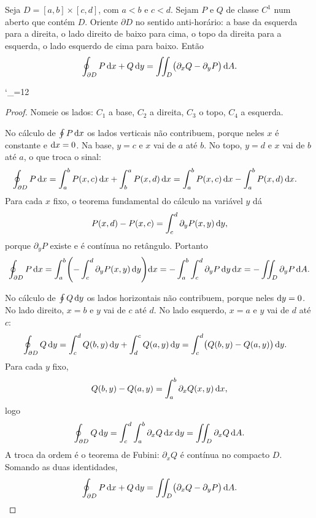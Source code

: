 \documentclass[11pt,a4paper]{article}
\begin{document}
\begin{teorema}
\label{thm:green-ret}
Seja $D=[a,b]\times[c,d]$, com $a<b$ e $c<d$. Sejam $P$ e $Q$ de classe $C^1$ num aberto que contém $D$. Oriente $\partial D$ no sentido anti-horário: a base da esquerda para a direita, o lado direito de baixo para cima, o topo da direita para a esquerda, o lado esquerdo de cima para baixo. Então
\[
\oint_{\partial D} P\,\mathrm{d} x+Q\,\mathrm{d} y
=\iint_D\bigl(\partial_x Q-\partial_y P\bigr)\,\mathrm{d} A.
\]
\end{teorema}

\begingroup\catcode`\_=12
\endgroup

\begin{proof}
Nomeie os lados: $C_1$ a base, $C_2$ a direita, $C_3$ o topo, $C_4$ a esquerda.

No cálculo de $\oint P\,\mathrm{d} x$ os lados verticais não contribuem, porque neles $x$ é constante e $\mathrm{d} x=0$. Na base, $y=c$ e $x$ vai de $a$ até $b$. No topo, $y=d$ e $x$ vai de $b$ até $a$, o que troca o sinal:
\begin{align*}
\oint_{\partial D} P\,\mathrm{d} x
&=\int_a^b P(x,c)\,\mathrm{d} x+\int_b^a P(x,d)\,\mathrm{d} x
=\int_a^b P(x,c)\,\mathrm{d} x-\int_a^b P(x,d)\,\mathrm{d} x.
\end{align*}
Para cada $x$ fixo, o teorema fundamental do cálculo na variável $y$ dá
\[
P(x,d)-P(x,c)=\int_c^d \partial_y P(x,y)\,\mathrm{d} y,
\]
porque $\partial_y P$ existe e é contínua no retângulo. Portanto
\[
\oint_{\partial D} P\,\mathrm{d} x
=\int_a^b\Biggl(-\int_c^d \partial_y P(x,y)\,\mathrm{d} y\Biggr)\mathrm{d} x
=-\int_a^b\int_c^d \partial_y P\,\mathrm{d} y\,\mathrm{d} x
=-\iint_D \partial_y P\,\mathrm{d} A.
\]

No cálculo de $\oint Q\,\mathrm{d} y$ os lados horizontais não contribuem, porque neles $\mathrm{d} y=0$. No lado direito, $x=b$ e $y$ vai de $c$ até $d$. No lado esquerdo, $x=a$ e $y$ vai de $d$ até $c$:
\begin{align*}
\oint_{\partial D} Q\,\mathrm{d} y
&=\int_c^d Q(b,y)\,\mathrm{d} y+\int_d^c Q(a,y)\,\mathrm{d} y
=\int_c^d\bigl(Q(b,y)-Q(a,y)\bigr)\,\mathrm{d} y.
\end{align*}
Para cada $y$ fixo,
\[
Q(b,y)-Q(a,y)=\int_a^b \partial_x Q(x,y)\,\mathrm{d} x,
\]
logo
\[
\oint_{\partial D} Q\,\mathrm{d} y
=\int_c^d\int_a^b \partial_x Q\,\mathrm{d} x\,\mathrm{d} y
=\iint_D \partial_x Q\,\mathrm{d} A.
\]
A troca da ordem é o teorema de Fubini: $\partial_x Q$ é contínua no compacto $D$. Somando as duas identidades,
\[
\oint_{\partial D} P\,\mathrm{d} x+Q\,\mathrm{d} y
=\iint_D\bigl(\partial_x Q-\partial_y P\bigr)\,\mathrm{d} A.
\]
\end{proof}
\end{document}
